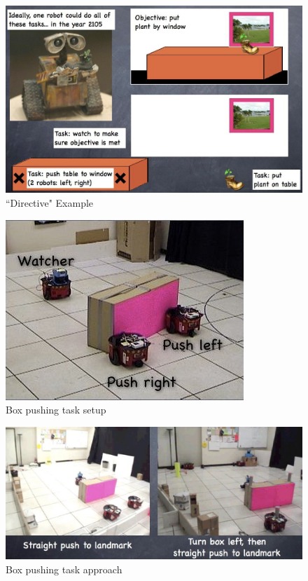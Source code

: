 \begin{figure}[!h]
\centering
\includegraphics[width=0.8\columnwidth]{figures/10_directive_example.jpg}
\caption{``Directive" Example}
\end{figure}

\begin{figure}[!h]
\centering
\includegraphics[width=0.5\columnwidth]{figures/10_box_example1.jpg}
\caption{Box pushing task setup}
\end{figure}

\begin{figure}[!h]
\centering
\includegraphics[width=1.0\columnwidth]{figures/10_box_example2.jpg}
\caption{Box pushing task approach}
\end{figure}


